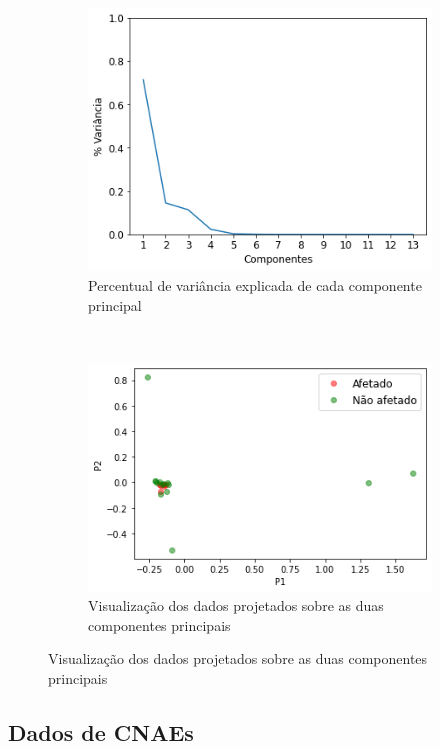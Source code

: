 \begin{figure}[htb] 
    \centering 
    \caption{PCA sobre dados totais de seções}
    \label{fig:resultados:base-de-dados-27-pca-components-total-secao} 
    \begin{subfigure}[b]{0.45\textwidth}
        \includegraphics[scale=0.45]{images/base-de-dados-27.1-pca-components-total-secao.png}
        \caption{Percentual de variância explicada de cada componente principal}
        \label{fig:resultados:base-de-dados-27.1-pca-components-total-secao}
    \end{subfigure} ~ \quad
    \begin{subfigure}[b]{0.45\textwidth}
        \includegraphics[scale=0.45]{images/base-de-dados-27.2-pca-2d-total-secao.png}
        \caption{Visualização dos dados projetados sobre as duas componentes principais}
        \label{fig:resultados:base-de-dados-27.2-pca-2d-total-secao}
    \end{subfigure}
    \fdadospesquisa
\end{figure}

\subsection{Dados de CNAEs}
\label{section:deteccao-impacto:cnae}

